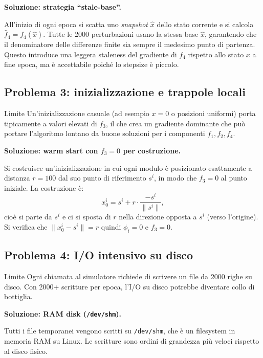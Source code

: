 \documentclass[12pt,a4paper]{article}
\theoremstyle{definition}
\begin{document}
\textbf{Soluzione: strategia ``stale-base''.}

All'inizio di ogni epoca si scatta uno \emph{snapshot} $\hat{x}$ dello stato corrente e si
calcola $\hat{f}_4 = f_4(\hat{x})$. Tutte le 2000 perturbazioni usano la stessa base $\hat{x}$,
garantendo che il denominatore delle differenze finite sia sempre il medesimo punto di partenza.
Questo introduce una leggera staleness del gradiente di $f_4$ rispetto allo stato $x$ a fine epoca,
ma è accettabile poiché lo stepsize è piccolo.

\subsection{Problema 3: inizializzazione e trappole locali}

\begin{warnbox}{Limite}
Un'inizializzazione casuale (ad esempio $x = 0$ o posizioni uniformi) porta tipicamente a
valori elevati di $f_3$, il che crea un gradiente dominante che può portare l'algoritmo
lontano da buone soluzioni per i componenti $f_1, f_2, f_4$.
\end{warnbox}

\textbf{Soluzione: warm start con $f_3 = 0$ per costruzione.}

Si costruisce un'inizializzazione in cui ogni modulo è posizionato esattamente a distanza $r = 100$
dal suo punto di riferimento $s^i$, in modo che $f_3 = 0$ al punto iniziale.
La costruzione è:
\[
  x^i_0 = s^i + r \cdot \frac{-s^i}{\|s^i\|},
\]
cioè si parte da $s^i$ e ci si sposta di $r$ nella direzione opposta a $s^i$ (verso l'origine).
Si verifica che $\|x^i_0 - s^i\| = r$ quindi $\phi_i = 0$ e $f_3 = 0$.

\subsection{Problema 4: I/O intensivo su disco}

\begin{warnbox}{Limite}
Ogni chiamata al simulatore richiede di scrivere un file da 2000 righe su disco.
Con 2000+ scritture per epoca, l'I/O su disco potrebbe diventare collo di bottiglia.
\end{warnbox}

\textbf{Soluzione: RAM disk (\texttt{/dev/shm}).}

Tutti i file temporanei vengono scritti su \texttt{/dev/shm}, che è un filesystem in memoria RAM
su Linux. Le scritture sono ordini di grandezza più veloci rispetto al disco fisico.
\end{document}
